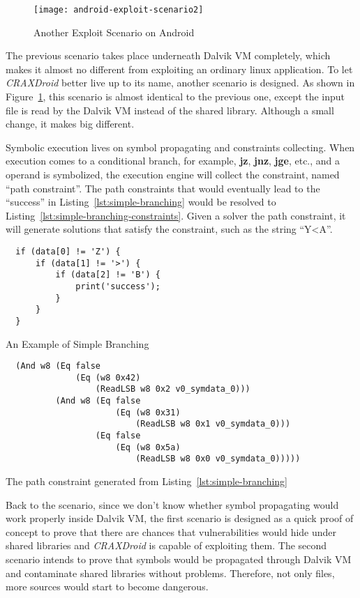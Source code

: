 \begin{figure}[!ht]
  \texttt{[image: android-exploit-scenario2]}
  \caption{Another Exploit Scenario on Android}
  \label{fig:android-exploit-scenario2}
\end{figure}

The previous scenario takes place underneath Dalvik VM completely, which makes
it almost no different from exploiting an ordinary linux application. To let
\emph{CRAXDroid} better live up to its name, another scenario is designed. As
shown in Figure~\ref{fig:android-exploit-scenario2}, this scenario is almost
identical to the previous one, except the input file is read by the Dalvik VM
instead of the shared library. Although a small change, it makes big different.

Symbolic execution lives on symbol propagating and constraints collecting. When
execution comes to a conditional branch, for example, \textbf{jz},
\textbf{jnz}, \textbf{jge}, etc., and a operand is symbolized, the execution
engine will collect the constraint, named ``path constraint''. The path
constraints that would eventually lead to the ``success'' in
Listing~\ref{lst:simple-branching} would be resolved to
Listing~\ref{lst:simple-branching-constraints}. Given a solver the path
constraint, it will generate solutions that satisfy the constraint, such as the
string ``Y\textless A''.

\begin{listing}[H]
  \begin{verbatim}
  if (data[0] != 'Z') {
      if (data[1] != '>') {
          if (data[2] != 'B') {
              print('success');
          }
      }
  }
  \end{verbatim}
  \caption{An Example of Simple Branching}
  \label{lst:simple-branching}
\end{listing}

\begin{listing}[H]
  \begin{verbatim}
  (And w8 (Eq false
              (Eq (w8 0x42)
                  (ReadLSB w8 0x2 v0_symdata_0)))
          (And w8 (Eq false
                      (Eq (w8 0x31)
                          (ReadLSB w8 0x1 v0_symdata_0)))
                  (Eq false
                      (Eq (w8 0x5a)
                          (ReadLSB w8 0x0 v0_symdata_0)))))
  \end{verbatim}
  \caption{The path constraint generated from Listing~\ref{lst:simple-branching}}
  \label{lst:simple-branching-constraints}
\end{listing}

Back to the scenario, since we don't know whether symbol propagating would work
properly inside Dalvik VM, the first scenario is designed as a quick proof of
concept to prove that there are chances that vulnerabilities would hide under
shared libraries and \emph{CRAXDroid} is capable of exploiting them. The second
scenario intends to prove that symbols would be propagated through Dalvik VM
and contaminate shared libraries without problems. Therefore, not only files,
more sources would start to become dangerous.

